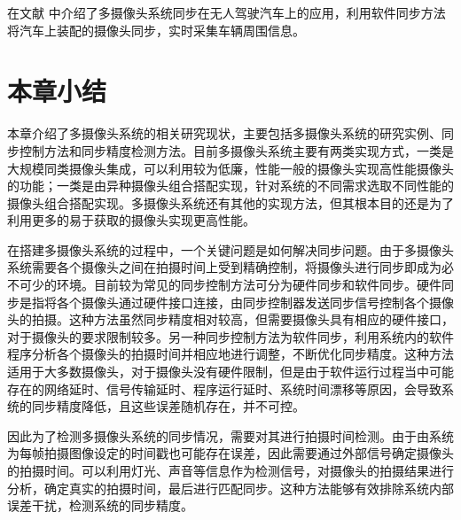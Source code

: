 在文献 \cite{macmillan2015auto, schaffner2016vehicle} 中介绍了多摄像头系统同步在无人驾驶汽车上的应用，利用软件同步方法将汽车上装配的摄像头同步，实时采集车辆周围信息。

\section{本章小结}

本章介绍了多摄像头系统的相关研究现状，主要包括多摄像头系统的研究实例、同步控制方法和同步精度检测方法。目前多摄像头系统主要有两类实现方式，一类是大规模同类摄像头集成，可以利用较为低廉，性能一般的摄像头实现高性能摄像头的功能；一类是由异种摄像头组合搭配实现，针对系统的不同需求选取不同性能的摄像头组合搭配实现。多摄像头系统还有其他的实现方法，但其根本目的还是为了利用更多的易于获取的摄像头实现更高性能。

在搭建多摄像头系统的过程中，一个关键问题是如何解决同步问题。由于多摄像头系统需要各个摄像头之间在拍摄时间上受到精确控制，将摄像头进行同步即成为必不可少的环境。目前较为常见的同步控制方法可分为硬件同步和软件同步。硬件同步是指将各个摄像头通过硬件接口连接，由同步控制器发送同步信号控制各个摄像头的拍摄。这种方法虽然同步精度相对较高，但需要摄像头具有相应的硬件接口，对于摄像头的要求限制较多。另一种同步控制方法为软件同步，利用系统内的软件程序分析各个摄像头的拍摄时间并相应地进行调整，不断优化同步精度。这种方法适用于大多数摄像头，对于摄像头没有硬件限制，但是由于软件运行过程当中可能存在的网络延时、信号传输延时、程序运行延时、系统时间漂移等原因，会导致系统的同步精度降低，且这些误差随机存在，并不可控。

因此为了检测多摄像头系统的同步情况，需要对其进行拍摄时间检测。由于由系统为每帧拍摄图像设定的时间戳也可能存在误差，因此需要通过外部信号确定摄像头的拍摄时间。可以利用灯光、声音等信息作为检测信号，对摄像头的拍摄结果进行分析，确定真实的拍摄时间，最后进行匹配同步。这种方法能够有效排除系统内部误差干扰，检测系统的同步精度。